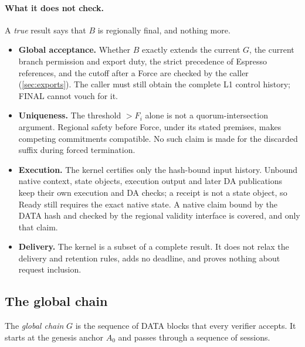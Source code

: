 \documentclass[11pt,a4paper]{article}
\newcommand{\defterm}[1]{\textcolor{rrBlue}{\textit{#1}}}
\begin{document}
\paragraph{What it does not check.}
A \emph{true} result says that $B$ is regionally final, and nothing more.
\begin{itemize}[itemsep=2pt]
\item \textbf{Global acceptance.} Whether $B$ exactly extends the
current $G$, the current branch permission and export duty, the strict
precedence of Espresso references, and the cutoff after a
Force are checked by the caller (\cref{sec:exports}). The caller must
still obtain the complete L1 control history; FINAL cannot vouch
for it.
\item \textbf{Uniqueness.} The threshold $>F_i$ alone is not a
quorum-intersection argument. Regional safety before Force, under its stated premises, makes
competing commitments compatible. No such claim is made for the
discarded suffix during forced termination.
\item \textbf{Execution.} The kernel certifies only the hash-bound
input history. Unbound native context, state objects, execution output
and later DA publications keep their own execution and DA
checks; a receipt is not a state object, so Ready still requires the
exact native state. A native claim bound by the DATA hash and checked by
the regional validity interface is covered, and only that claim.
\item \textbf{Delivery.} The kernel is a subset of a complete result.
It does not relax the delivery and retention rules, adds no deadline,
and proves nothing about request inclusion.
\end{itemize}

\subsection{The global chain}
\label{sec:global-finality}
\label{sec:global-chain}
The \defterm{global chain} $G$ is the sequence of DATA blocks that every
verifier accepts. It starts at the genesis anchor $A_0$ and passes
through a sequence of sessions.
\end{document}
